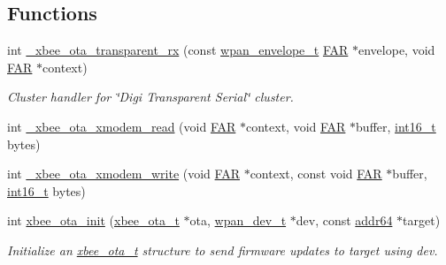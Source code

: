 \subsection*{Functions}
\begin{DoxyCompactItemize}
\item 
int \hyperlink{group__xbee__ota__client_ga8d196639e5234b3a56eb5c00ae730261}{\-\_\-xbee\-\_\-ota\-\_\-transparent\-\_\-rx} (const \hyperlink{structwpan__envelope__t}{wpan\-\_\-envelope\-\_\-t} \hyperlink{group__hal_gaef060b3456fdcc093a7210a762d5f2ed}{F\-A\-R} $\ast$envelope, void \hyperlink{group__hal_gaef060b3456fdcc093a7210a762d5f2ed}{F\-A\-R} $\ast$context)
\begin{DoxyCompactList}\small\item\em Cluster handler for \char`\"{}\-Digi Transparent Serial\char`\"{} cluster. \end{DoxyCompactList}\item 
int \hyperlink{group__xbee__ota__client_ga1e29a78ac03e3450859847d4a5e3b73b}{\-\_\-xbee\-\_\-ota\-\_\-xmodem\-\_\-read} (void \hyperlink{group__hal_gaef060b3456fdcc093a7210a762d5f2ed}{F\-A\-R} $\ast$context, void \hyperlink{group__hal_gaef060b3456fdcc093a7210a762d5f2ed}{F\-A\-R} $\ast$buffer, \hyperlink{group__hal_ga2140805d08462d474b82ddc8d1c2f3e6}{int16\-\_\-t} bytes)
\item 
int \hyperlink{group__xbee__ota__client_ga88905a78517417dd42f6356038717d01}{\-\_\-xbee\-\_\-ota\-\_\-xmodem\-\_\-write} (void \hyperlink{group__hal_gaef060b3456fdcc093a7210a762d5f2ed}{F\-A\-R} $\ast$context, const void \hyperlink{group__hal_gaef060b3456fdcc093a7210a762d5f2ed}{F\-A\-R} $\ast$buffer, \hyperlink{group__hal_ga2140805d08462d474b82ddc8d1c2f3e6}{int16\-\_\-t} bytes)
\item 
int \hyperlink{group__xbee__ota__client_ga4805b029d840b86133ef62d64866c6af}{xbee\-\_\-ota\-\_\-init} (\hyperlink{structxbee__ota__t}{xbee\-\_\-ota\-\_\-t} $\ast$ota, \hyperlink{structwpan__dev__t}{wpan\-\_\-dev\-\_\-t} $\ast$dev, const \hyperlink{unionaddr64}{addr64} $\ast$target)
\begin{DoxyCompactList}\small\item\em Initialize an \hyperlink{structxbee__ota__t}{xbee\-\_\-ota\-\_\-t} structure to send firmware updates to {\ttfamily target} using {\ttfamily dev}. \end{DoxyCompactList}\end{DoxyCompactItemize}
